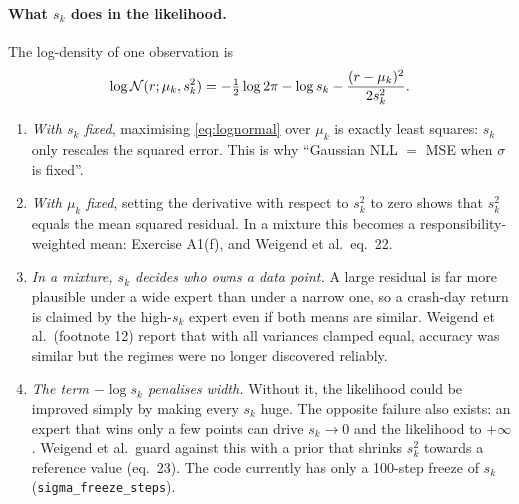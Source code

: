 \paragraph{What $s_k$ does in the likelihood.} The log-density of one observation is
\begin{equation}\label{eq:lognormal}
\log\mathcal{N}(r;\mu_k,s_k^2)=-\tfrac12\log 2\pi-\log s_k-\frac{(r-\mu_k)^2}{2s_k^2}.
\end{equation}
\begin{enumerate}
  \item \emph{With $s_k$ fixed}, maximising \eqref{eq:lognormal} over $\mu_k$ is exactly least squares: $s_k$ only rescales the squared error. This is why ``Gaussian NLL $=$ MSE when $\sigma$ is fixed''.
  \item \emph{With $\mu_k$ fixed}, setting the derivative with respect to $s_k^2$ to zero shows that $s_k^2$ equals the mean squared residual. In a mixture this becomes a responsibility-weighted mean: Exercise A1(f), and Weigend et al.\ eq.~22.
  \item \emph{In a mixture, $s_k$ decides who owns a data point.} A large residual is far more plausible under a wide expert than under a narrow one, so a crash-day return is claimed by the high-$s_k$ expert even if both means are similar. Weigend et al.\ (footnote 12) report that with all variances clamped equal, accuracy was similar but the regimes were no longer discovered reliably.
  \item \emph{The term $-\log s_k$ penalises width.} Without it, the likelihood could be improved simply by making every $s_k$ huge. The opposite failure also exists: an expert that wins only a few points can drive $s_k\to0$ and the likelihood to $+\infty$. Weigend et al.\ guard against this with a prior that shrinks $s_k^2$ towards a reference value (eq.~23). The code currently has only a 100-step freeze of $s_k$ (\texttt{sigma\_freeze\_steps}).
\end{enumerate}
\newpage
